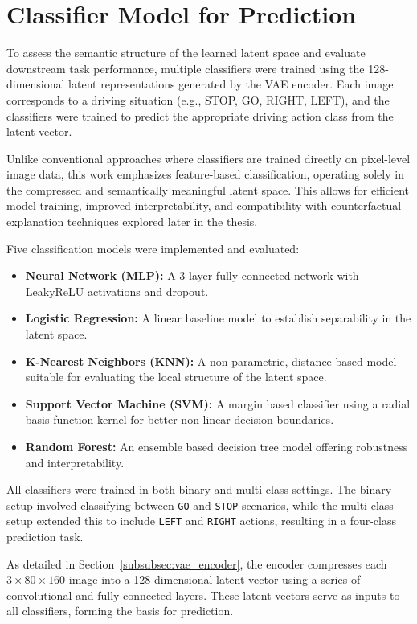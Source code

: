 \section{Classifier Model for Prediction} \label{sec:classifier_mdel_for_prediction}


To assess the semantic structure of the learned latent space and evaluate downstream task performance, multiple classifiers were trained using the 128-dimensional latent representations generated by the VAE encoder. Each image corresponds to a driving situation (e.g., STOP, GO, RIGHT, LEFT), and the classifiers were trained to predict the appropriate driving action class from the latent vector.

Unlike conventional approaches where classifiers are trained directly on pixel-level image data, this work emphasizes feature-based classification, operating solely in the compressed and semantically meaningful latent space. This allows for efficient model training, improved interpretability, and compatibility with counterfactual explanation techniques explored later in the thesis.

Five classification models were implemented and evaluated:
\begin{itemize}
    \item \textbf{Neural Network (MLP):} A 3-layer fully connected network with LeakyReLU activations and dropout.
    \item \textbf{Logistic Regression:} A linear baseline model to establish separability in the latent space.
    \item \textbf{K-Nearest Neighbors (KNN):} A non-parametric, distance based model suitable for evaluating the local structure of the latent space.
    \item \textbf{Support Vector Machine (SVM):} A margin based classifier using a radial basis function kernel for better non-linear decision boundaries.
    \item \textbf{Random Forest:} An ensemble based decision tree model offering robustness and interpretability.
\end{itemize}

All classifiers were trained in both binary and multi-class settings. The binary setup involved classifying between \texttt{GO} and \texttt{STOP} scenarios, while the multi-class setup extended this to include \texttt{LEFT} and \texttt{RIGHT} actions, resulting in a four-class prediction task.

As detailed in Section~\ref{subsubsec:vae_encoder}, the encoder compresses each $3 \times 80 \times 160$ image into a 128-dimensional latent vector using a series of convolutional and fully connected layers. These latent vectors serve as inputs to all classifiers, forming the basis for prediction.

